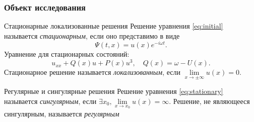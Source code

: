 \documentclass [10pt] {beamer}
\begin{document}
\begin{frame}
	\frametitle{Объект исследования}

	\begin{block}{Стационарные локализованные решения}
	 	Решение уравнения \eqref{eq:initial} называется {\it \color{ceruleanblue} стационарным}, если оно представимо в виде
	 	\begin{equation}
			\Psi(t, x) = u(x) e^{-i \omega t}.	 		
	 	\end{equation}
		Уравнение для стационарных состояний:
		\begin{equation}
			u_{xx} + Q(x) u + P(x) u^3, \quad Q(x) = \omega - U(x).
			\label{eq:stationary}
		\end{equation}
		Стационарное решение называется {\it \color{ceruleanblue} локализованным}, если $\lim \limits_{x \to \pm \infty} u(x) = 0$.
	\end{block}

	\medskip

	\begin{block}{Регулярные и сингулярные решения}
		Решение уравнения \eqref{eq:stationary} называется {\it \color{ceruleanblue} сингулярным}, если $\exists x_0, \lim \limits_{x \to x_0} u(x) = \infty$.
		Решение, не являющееся сингулярным, называется {\it \color{ceruleanblue} регулярным} 
	\end{block}
\end{frame}
\end{document}
